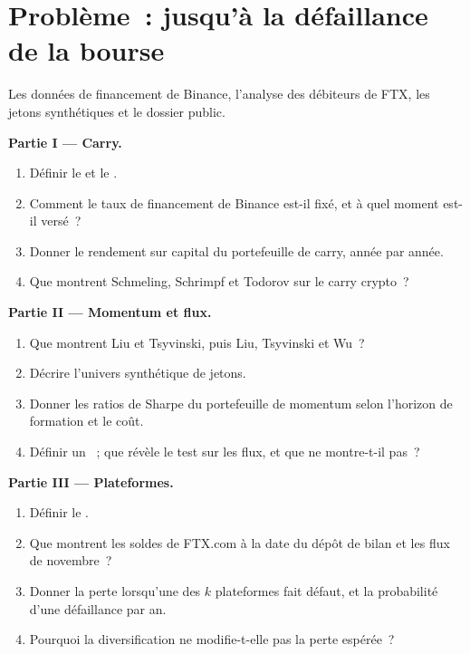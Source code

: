 \section{Problème~: jusqu'à la défaillance de la bourse}

\begin{problem}\label{pb:s1:crypto-medium-frequency-strategies:1}
Les données de financement de Binance, l'analyse des débiteurs de FTX, les jetons synthétiques et le dossier public.

\medskip\noindent\textbf{Partie I --- Carry.}
\begin{enumerate}
\item Définir le  et le .
\item Comment le taux de financement de Binance est-il fixé, et à quel moment est-il versé~?
\item Donner le rendement sur capital du portefeuille de carry, année par année.
\item Que montrent Schmeling, Schrimpf et Todorov sur le carry crypto~?
\end{enumerate}

\medskip\noindent\textbf{Partie II --- Momentum et flux.}
\begin{enumerate}[resume]
\item Que montrent Liu et Tsyvinski, puis Liu, Tsyvinski et Wu~?
\item Décrire l'univers synthétique de jetons.
\item Donner les ratios de Sharpe du portefeuille de momentum selon l'horizon de formation et le coût.
\item Définir un ~; que révèle le test sur les flux, et que ne montre-t-il pas~?
\end{enumerate}

\medskip\noindent\textbf{Partie III --- Plateformes.}
\begin{enumerate}[resume]
\item Définir le .
\item Que montrent les soldes de FTX.com à la date du dépôt de bilan et les flux de novembre~?
\item Donner la perte lorsqu'une des $k$ plateformes fait défaut, et la probabilité d'une défaillance par an.
\item Pourquoi la diversification ne modifie-t-elle pas la perte espérée~?
\end{enumerate}


\end{problem}
